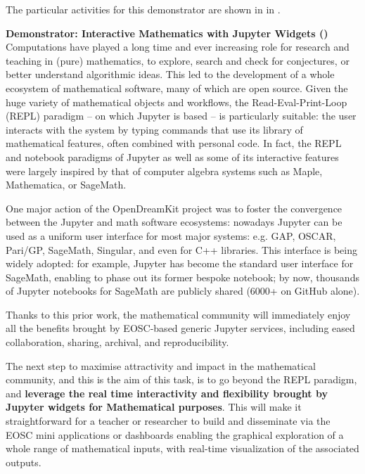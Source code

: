   The particular activities for this demonstrator are shown in
   in .

\medskip
\noindent\textbf{Demonstrator: Interactive Mathematics with Jupyter Widgets ()}\label{sec:concept-demonstrator-math}\\
  Computations have played a long time and ever increasing role for
  research and teaching in (pure) mathematics, to explore, search and
  check for conjectures, or better understand algorithmic ideas. This
  led to the development of a whole ecosystem of mathematical
  software, many of which are open source. Given the huge variety of
  mathematical objects and workflows, the Read-Eval-Print-Loop (REPL)
  paradigm -- on which Jupyter is based -- is particularly suitable:
  the user interacts with the system by typing commands that use its
  library of mathematical features, often combined with personal code.
  In fact, the REPL and notebook paradigms of Jupyter as well as some
  of its interactive features were largely inspired by that of
  computer algebra systems such as Maple, Mathematica, or SageMath.

  One major action of the OpenDreamKit project was to foster the
  convergence between the Jupyter and math software ecosystems:
  nowadays Jupyter can be used as a uniform user interface for most
  major systems: e.g. GAP, OSCAR, Pari/GP, SageMath, Singular, and
  even for C++ libraries. This interface is being widely adopted: for
  example, Jupyter has become the standard user interface for
  SageMath, enabling to phase out its former bespoke notebook; by now,
  thousands of Jupyter notebooks for SageMath are publicly shared
  (6000+ on GitHub alone).

  Thanks to this prior work, the mathematical community will
  immediately enjoy all the benefits brought by EOSC-based generic
  Jupyter services, including eased collaboration, sharing, archival,
  and reproducibility.

  The next step to maximise attractivity and impact in the
  mathematical community, and this is the aim of this task, is to go
  beyond the REPL paradigm, and \textbf{leverage the real time
    interactivity and flexibility brought by Jupyter widgets for
    Mathematical purposes}. This will make it straightforward for a teacher or
  researcher to build and disseminate via the EOSC mini applications
  or dashboards enabling the graphical exploration of a whole range of
  mathematical inputs, with real-time visualization of the associated
  outputs.

